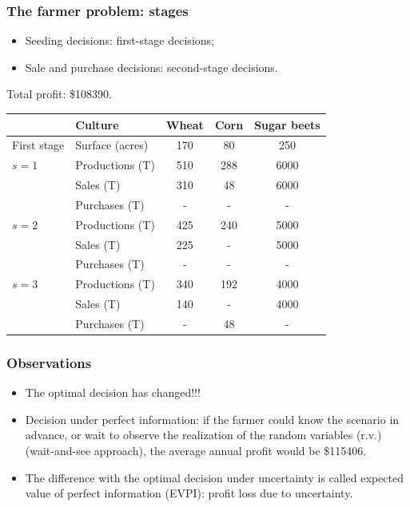 \documentclass{beamer}
\def\blue{\color{blue}}
\def\red{\color{red}}
\begin{document}
\begin{frame}
\frametitle{The farmer problem: stages}

\begin{itemize}
	\item 
Seeding decisions: {\red first-stage decisions};
	\item 
Sale and purchase decisions: {\red second-stage decisions}.
\end{itemize}

Total profit: \$108390.
\begin{center}
\begin{tabular}{llccc}
\hline
& Culture & Wheat & Corn & Sugar beets \\
\hline
First stage & Surface (acres) & 170 & 80 & 250 \\
\hline
$s = 1$ & Productions (T) & 510 & 288 & 6000 \\
& Sales (T) & 310 & 48 & 6000 \\
& Purchases (T) & - & - & - \\
\hline
$s = 2$ & Productions (T) & 425 & 240 & 5000 \\
& Sales (T) & 225 & - & 5000 \\
& Purchases (T) & - & - & - \\
\hline
$s = 3$ & Productions (T) & 340 & 192 & 4000 \\
& Sales (T) & 140 & - & 4000 \\
& Purchases (T) & - & 48 & - \\
\hline
\end{tabular}
\end{center}

\end{frame}

\begin{frame}
\frametitle{Observations}

\begin{itemize}
	\item 
The optimal decision has changed!!!
\item
Decision under {\red perfect information}:
if the farmer could know the scenario in advance, or wait to observe the realization of the random variables (r.v.) ({\red wait-and-see} approach),
the average annual profit would be \$115406.
\item
The difference with the optimal decision under uncertainty is called {\blue expected value of perfect information (EVPI)}: profit loss due to uncertainty. 
\end{itemize}

\end{frame}
\end{document}
